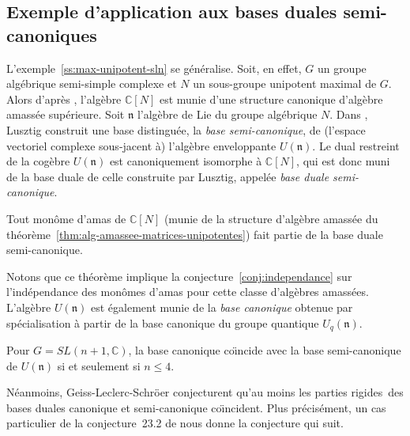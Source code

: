 \documentclass[brochure,12pt]{bourbaki}
\newcommand{\og}{\guillemotleft\hspace*{1pt}}
\newcommand{\fg}{\hspace*{1pt}\guillemotright}
\numberwithin{equation}{subsection}
\numberwithin{theorem}{section}
\newcommand{\C}{\mathbb{C}}
\begin{document}
\subsection{Exemple d'application aux bases duales semi-canoniques}
\label{ss:application-aux-bases-duales-semi-canoniques}
L'exemple~\ref{ss:max-unipotent-sln} se g\'en\'eralise. Soit, en effet, $G$
un groupe alg\'ebrique semi-simple complexe et $N$ un sous-groupe
unipotent maximal de $G$. Alors d'apr\`es \cite{BerensteinFominZelevinsky05},
l'alg\`ebre $\C[N]$ est munie d'une structure canonique
d'alg\`ebre amass\'ee sup\'erieure.
Soit $\mathfrak{n}$ l'alg\`ebre de Lie du groupe alg\'ebrique $N$.
Dans \cite{Lusztig00}, Lusztig construit une base distingu\'ee, la
{\em base semi-canonique}, de (l'espace vectoriel complexe sous-jacent \`a)
l'alg\`ebre enveloppante $U(\mathfrak{n})$.
Le dual restreint de la cog\`ebre $U(\mathfrak{n})$
est canoniquement isomorphe \`a $\C[N]$, qui est donc muni
de la base duale de celle construite par Lusztig, appel\'ee
{\em base duale semi-canonique}.

\begin{theo}
\label{thm:monomes-damas-base-semi-canonique}
  Tout mon\^ome d'amas de $\C[N]$ (munie de la structure d'alg\`ebre
  amass\'ee du
  th\'eor\`eme~\ref{thm:alg-amassee-matrices-unipotentes}) fait partie
  de la base duale semi-canonique.
\end{theo}

Notons que ce th\'eor\`eme implique la conjecture~\ref{conj:independance}
sur l'ind\'ependance des mon\^omes d'amas pour cette classe d'alg\`ebres amass\'ees.
L'alg\`ebre $U(\mathfrak{n})$ est \'egalement munie de
la {\em base canonique} obtenue par sp\'ecialisation \`a
partir de la base canonique \cite{Kashiwara90} \cite{Lusztig90}
du groupe quantique $U_q(\mathfrak{n})$.

\begin{theo}
Pour $G=SL(n+1,\C)$, la base cano\-nique
co\"{\i}ncide avec la base semi-canonique de $U(\mathfrak{n})$
si et seulement si $n\leq 4$.
\end{theo}

N\'eanmoins, Geiss-Leclerc-Schr\"oer conjecturent qu'au moins les
\og parties rigides\fg\ des bases duales canonique et semi-canonique
co\"{\i}ncident. Plus pr\'ecis\'ement, un cas parti\-culier
de la conjecture~23.2 de \cite{GeissLeclercSchroeer07b} nous donne
la conjecture qui suit.
\end{document}
